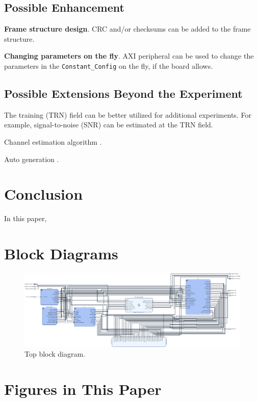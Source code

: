 \documentclass[journal,twoside]{IEEEtran}
\begin{document}
    \subsection{Possible Enhancement}

      \textbf{Frame structure design}.
      CRC and/or checksums can be added to the frame structure.

      \textbf{Changing parameters on the fly}.
      AXI peripheral \cite{xilinx:pg127} can be used to change the parameters in the \texttt{Constant\_Config} on the fly,
      if the board allows.

    \subsection{Possible Extensions Beyond the Experiment}

      The training (TRN) field can be better utilized for additional experiments.
      For example, signal-to-noise (SNR) can be estimated at the TRN field.

      Channel estimation algorithm \cite{zhao2023ompl,you2023beam}.

      Auto generation \cite{zhao2023automatic}.

  \section{Conclusion}

    In this paper,


  \appendices

  \section{Block Diagrams}

    \begin{figure}
      \includegraphics[width=\linewidth]{../schematic/top.pdf}
      \caption{Top block diagram.}
    \end{figure}

  \section{Figures in This Paper}

  
  
\end{document}
